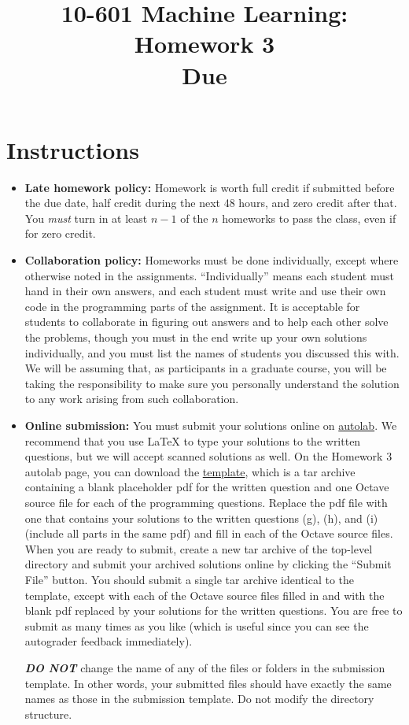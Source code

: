 \documentclass{article}
\title{
  10-601 Machine Learning: Homework 3\\
  \vspace{0.2cm}
  \large{
    Due \duedate{}
  }
}
\date{}
\author{}
\begin{document}
\maketitle

\section*{Instructions}
\begin{itemize}
\item {\bf Late homework policy:} Homework is worth full credit if
  submitted before the due date, half credit during the next 48 hours,
  and zero credit after that.  You {\em must} turn in at least $n-1$
  of the $n$ homeworks to pass the class, even if for zero credit.
\item {\bf Collaboration policy:} Homeworks must be done individually,
  except where otherwise noted in the assignments. ``Individually''
  means each student must hand in their own answers, and each student
  must write and use their own code in the programming parts of the
  assignment. It is acceptable for students to collaborate in figuring
  out answers and to help each other solve the problems, though you
  must in the end write up your own solutions individually, and you
  must list the names of students you discussed this with.  We will be
  assuming that, as participants in a graduate course, you will be
  taking the responsibility to make sure you personally understand the
  solution to any work arising from such collaboration.

\item {\bf Online submission:} You must submit your solutions online
  on
  \href{https://autolab.cs.cmu.edu/courses/27/assessments/223}{autolab}. We
  recommend that you use \LaTeX{} to type your solutions to the
  written questions, but we will accept scanned solutions as well. On
  the Homework 3 autolab page, you can download the
  \href{https://autolab.cs.cmu.edu/courses/27/assessments/223/attachments}{template},
  which is a tar archive containing a blank placeholder pdf for the
  written question and one Octave source file for each of the
  programming questions. Replace the pdf file with one that contains
  your solutions to the written questions (g), (h), and (i) (include
  all parts in the same pdf) and fill in each of the Octave source
  files. When you are ready to submit, create a new tar archive of the
  top-level directory and submit your archived solutions online by
  clicking the ``Submit File'' button. You should submit a single tar
  archive identical to the template, except with each of the Octave
  source files filled in and with the blank pdf replaced by your
  solutions for the written questions. You are free to submit as many
  times as you like (which is useful since you can see the autograder
  feedback immediately).

  \textbf{\emph{DO NOT}} change the name of any of the files or
  folders in the submission template. In other words, your submitted
  files should have exactly the same names as those in the submission
  template. Do not modify the directory structure.
\end{itemize}
\end{document}
